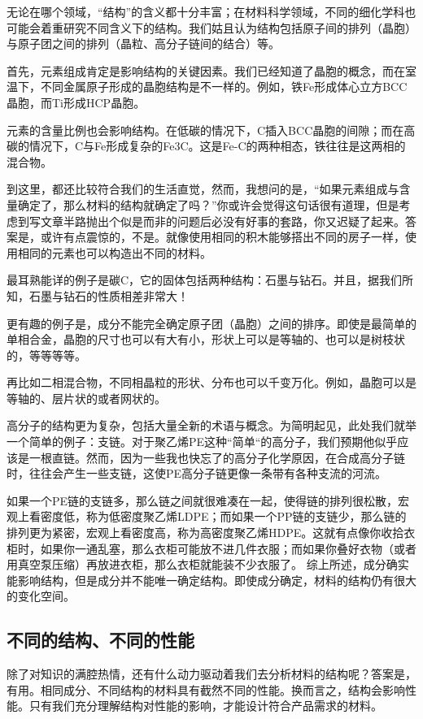 无论在哪个领域，“结构”的含义都十分丰富；在材料科学领域，不同的细化学科也可能会着重研究不同含义下的结构。我们姑且认为结构包括原子间的排列（晶胞）与原子团之间的排列（晶粒、高分子链间的结合）等。

首先，元素组成肯定是影响结构的关键因素。我们已经知道了晶胞的概念，而在室温下，不同金属原子形成的晶胞结构是不一样的。例如，铁Fe形成体心立方BCC晶胞，而Ti形成HCP晶胞。

元素的含量比例也会影响结构。在低碳的情况下，C插入BCC晶胞的间隙；而在高碳的情况下，C与Fe形成复杂的Fe3C。这是Fe-C的两种相态，铁往往是这两相的混合物。

到这里，都还比较符合我们的生活直觉，然而，我想问的是，“如果元素组成与含量确定了，那么材料的结构就确定了吗？”你或许会觉得这句话很有道理，但是考虑到写文章半路抛出个似是而非的问题后必没有好事的套路，你又迟疑了起来。答案是，或许有点震惊的，不是。就像使用相同的积木能够搭出不同的房子一样，使用相同的元素也可以构造出不同的材料。

最耳熟能详的例子是碳C，它的固体包括两种结构：石墨与钻石。并且，据我们所知，石墨与钻石的性质相差非常大！

更有趣的例子是，成分不能完全确定原子团（晶胞）之间的排序。即使是最简单的单相合金，晶胞的尺寸也可以有大有小，形状上可以是等轴的、也可以是树枝状的，等等等等。

再比如二相混合物，不同相晶粒的形状、分布也可以千变万化。例如，晶胞可以是等轴的、层片状的或者网状的。

高分子的结构更为复杂，包括大量全新的术语与概念。为简明起见，此处我们就举一个简单的例子：支链。对于聚乙烯PE这种“简单“的高分子，我们预期他似乎应该是一根直链。然而，因为一些我也快忘了的高分子化学原因，在合成高分子链时，往往会产生一些支链，这使PE高分子链更像一条带有各种支流的河流。

如果一个PE链的支链多，那么链之间就很难凑在一起，使得链的排列很松散，宏观上看密度低，称为低密度聚乙烯LDPE；而如果一个PP链的支链少，那么链的排列更为紧密，宏观上看密度高，称为高密度聚乙烯HDPE。这就有点像你收拾衣柜时，如果你一通乱塞，那么衣柜可能放不进几件衣服；而如果你叠好衣物（或者用真空泵压缩）再放进衣柜，那么衣柜就能装不少衣服了。
综上所述，成分确实能影响结构，但是成分并不能唯一确定结构。即使成分确定，材料的结构仍有很大的变化空间。
 
\subsection{不同的结构、不同的性能}

除了对知识的满腔热情，还有什么动力驱动着我们去分析材料的结构呢？答案是，有用。相同成分、不同结构的材料具有截然不同的性能。换而言之，结构会影响性能。只有我们充分理解结构对性能的影响，才能设计符合产品需求的材料。

